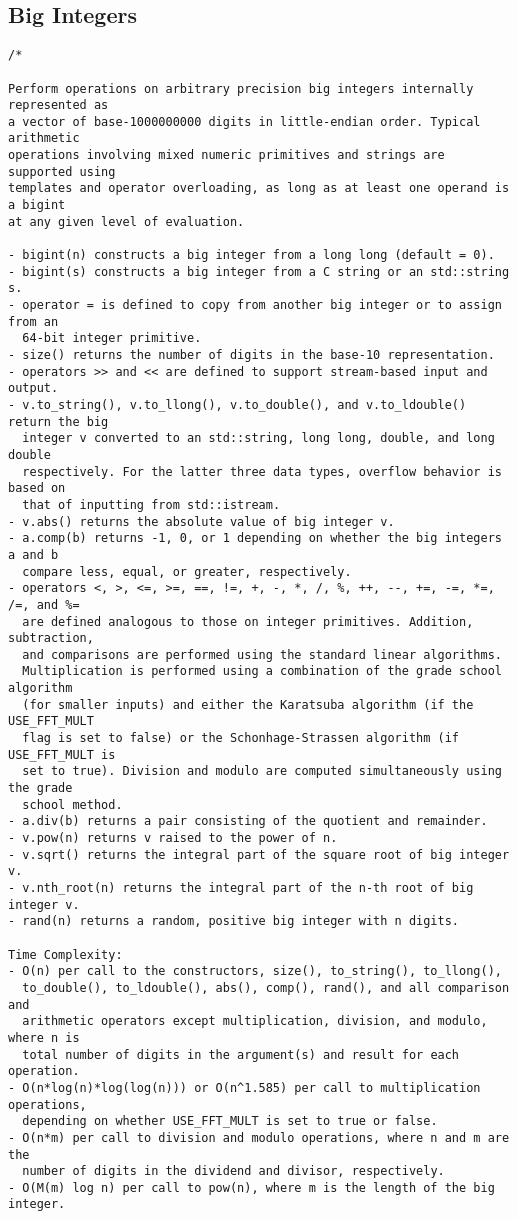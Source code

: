 \subsection{Big Integers}
\begin{lstlisting}
/*

Perform operations on arbitrary precision big integers internally represented as
a vector of base-1000000000 digits in little-endian order. Typical arithmetic
operations involving mixed numeric primitives and strings are supported using
templates and operator overloading, as long as at least one operand is a bigint
at any given level of evaluation.

- bigint(n) constructs a big integer from a long long (default = 0).
- bigint(s) constructs a big integer from a C string or an std::string s.
- operator = is defined to copy from another big integer or to assign from an
  64-bit integer primitive.
- size() returns the number of digits in the base-10 representation.
- operators >> and << are defined to support stream-based input and output.
- v.to_string(), v.to_llong(), v.to_double(), and v.to_ldouble() return the big
  integer v converted to an std::string, long long, double, and long double
  respectively. For the latter three data types, overflow behavior is based on
  that of inputting from std::istream.
- v.abs() returns the absolute value of big integer v.
- a.comp(b) returns -1, 0, or 1 depending on whether the big integers a and b
  compare less, equal, or greater, respectively.
- operators <, >, <=, >=, ==, !=, +, -, *, /, %, ++, --, +=, -=, *=, /=, and %=
  are defined analogous to those on integer primitives. Addition, subtraction,
  and comparisons are performed using the standard linear algorithms.
  Multiplication is performed using a combination of the grade school algorithm
  (for smaller inputs) and either the Karatsuba algorithm (if the USE_FFT_MULT
  flag is set to false) or the Schonhage-Strassen algorithm (if USE_FFT_MULT is
  set to true). Division and modulo are computed simultaneously using the grade
  school method.
- a.div(b) returns a pair consisting of the quotient and remainder.
- v.pow(n) returns v raised to the power of n.
- v.sqrt() returns the integral part of the square root of big integer v.
- v.nth_root(n) returns the integral part of the n-th root of big integer v.
- rand(n) returns a random, positive big integer with n digits.

Time Complexity:
- O(n) per call to the constructors, size(), to_string(), to_llong(),
  to_double(), to_ldouble(), abs(), comp(), rand(), and all comparison and
  arithmetic operators except multiplication, division, and modulo, where n is
  total number of digits in the argument(s) and result for each operation.
- O(n*log(n)*log(log(n))) or O(n^1.585) per call to multiplication operations,
  depending on whether USE_FFT_MULT is set to true or false.
- O(n*m) per call to division and modulo operations, where n and m are the
  number of digits in the dividend and divisor, respectively.
- O(M(m) log n) per call to pow(n), where m is the length of the big integer.


\end{lstlisting}
